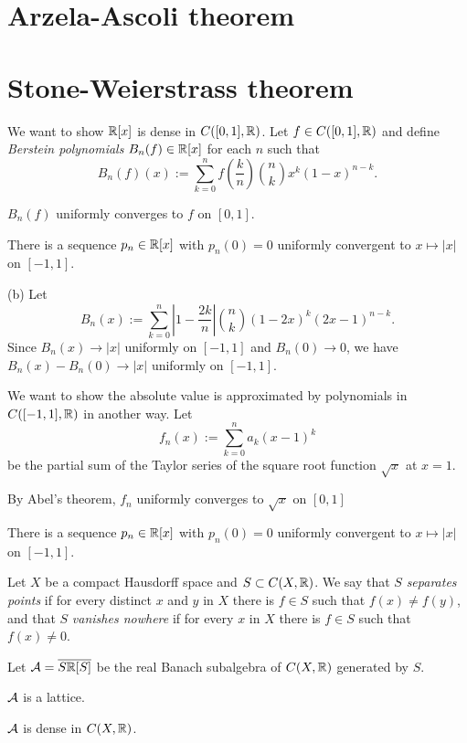 \documentclass{../../large}
\begin{document}
\section{Arzela-Ascoli theorem}

\section{Stone-Weierstrass theorem}

\begin{prb}
We want to show $\mathbb{R}[x]$ is dense in $C([0,1],\mathbb{R})$.
Let $f\in C([0,1],\mathbb{R})$ and define \emph{Berstein polynomials} $B_n(f)\in\mathbb{R}[x]$ for each $n$ such that
\[B_n(f)(x):=\sum_{k=0}^nf\left(\frac kn\right)\binom nkx^k(1-x)^{n-k}.\]
\begin{parts}
\item $B_n(f)$ uniformly converges to $f$ on $[0,1]$.
\item There is a sequence $p_n\in\mathbb{R}[x]$ with $p_n(0)=0$ uniformly convergent to $x\mapsto|x|$ on $[-1,1]$.
\end{parts}
\end{prb}
\begin{pf}
(b)
Let
\[B_n(x):=\sum_{k=0}^n\left|1-\frac{2k}n\right|\binom nk(1-2x)^k(2x-1)^{n-k}.\]
Since $B_n(x)\to|x|$ uniformly on $[-1,1]$ and $B_n(0)\to0$, we have $B_n(x)-B_n(0)\to|x|$ uniformly on $[-1,1]$.
\end{pf}

\begin{prb}
We want to show the absolute value is approximated by polynomials in $C([-1,1],\mathbb{R})$ in another way.
Let
\[f_n(x):=\sum_{k=0}^n a_k(x-1)^k\]
be the partial sum of the Taylor series of the square root function $\sqrt x$ at $x=1$.
\begin{parts}
\item By Abel's theorem, $f_n$ uniformly converges to $\sqrt x$ on $[0,1]$
\item There is a sequence $p_n\in\mathbb{R}[x]$ with $p_n(0)=0$ uniformly convergent to $x\mapsto|x|$ on $[-1,1]$.
\end{parts}
\end{prb}


\begin{prb}
Let $X$ be a compact Hausdorff space and $S\subset C(X,\mathbb{R})$.
We say that $S$ \emph{separates points} if for every distinct $x$ and $y$ in $X$ there is $f\in S$ such that $f(x)\ne f(y)$, and that $S$ \emph{vanishes nowhere} if for every $x$ in $X$ there is $f\in S$ such that $f(x)\ne0$.

Let $\mathcal{A}=\overline{S\mathbb{R}[S]}$ be the real Banach subalgebra of $C(X,\mathbb{R})$ generated by $S$.
\begin{parts}
\item $\mathcal{A}$ is a lattice.
\item $\mathcal{A}$ is dense in $C(X,\mathbb{R})$.
\end{parts}
\end{prb}
\end{document}
